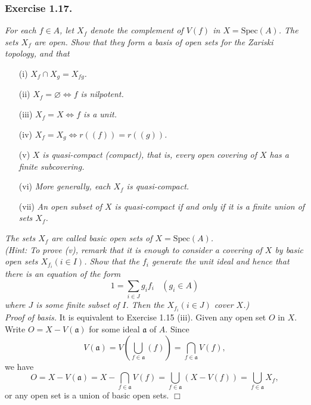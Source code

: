 \documentclass{article}
\begin{document}



\subsubsection*{Exercise 1.17.}
\emph{For each $f \in A$,
let $X_f$ denote the complement of $V(f)$ in $X = \mathrm{Spec}(A)$.
The sets $X_f$ are open.
Show that they form a basis of open sets for the Zariski topology, and that}
\begin{enumerate}
\item[(i)]
\emph{$X_f \cap X_g = X_{fg}$.}
\item[(ii)]
\emph{$X_f = \varnothing \Longleftrightarrow f$ is nilpotent.}
\item[(iii)]
\emph{$X_f = X \Longleftrightarrow f$ is a unit.}
\item[(iv)]
\emph{$X_f = X_g \Longleftrightarrow r((f)) = r((g))$.}
\item[(v)]
\emph{$X$ is quasi-compact (compact), that is,
every open covering of $X$ has a finite subcovering.}
\item[(vi)]
\emph{More generally, each $X_f$ is quasi-compact.}
\item[(vii)]
\emph{An open subset of $X$ is quasi-compact if and only if
it is a finite union of sets $X_f$.}
\end{enumerate}

\emph{The sets $X_f$ are called basic open sets of
$X = \mathrm{Spec}(A)$.} \\

\emph{(Hint: To prove (v), remark that it is enough to consider a covering of $X$
by basic open sets $X_{f_i} (i \in I)$.
Show that the $f_i$ generate the unit ideal and hence that
there is an equation of the form
$$1 = \sum_{i \in J} g_i f_i \:\:\:\: (g_i \in A)$$
where $J$ is some finite subset of $I$.
Then the $X_{f_i} (i \in J)$ cover $X$.)} \\



\emph{Proof of basis.}
It is equivalent to Exercise 1.15 (iii).
Given any open set $O$ in $X$.
Write $O = X - V(\mathfrak{a})$ for some ideal $\mathfrak{a}$ of $A$.
Since
$$V(\mathfrak{a})
= V \left( \bigcup_{f \in \mathfrak{a}} (f) \right)
= \bigcap_{f \in \mathfrak{a}} V(f),$$
we have
$$O
= X - V(\mathfrak{a})
= X - \bigcap_{f \in \mathfrak{a}} V(f)
= \bigcup_{f \in \mathfrak{a}} (X - V(f))
= \bigcup_{f \in \mathfrak{a}} X_f,$$
or any open set is a union of basic open sets.
$\Box$ \\
\end{document}
